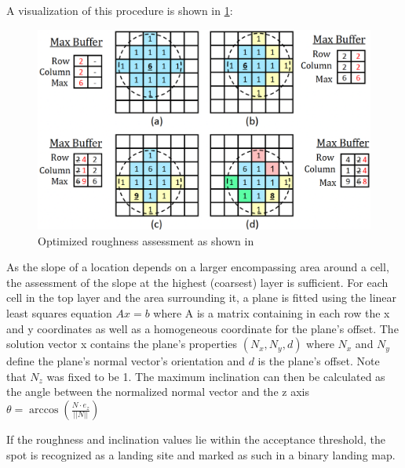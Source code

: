 A visualization of this procedure is shown in \cref{fig:lsd_roughness_check}:

\begin{figure}[ht!]
    \centering
    \includegraphics[scale=0.5]{images/system_overview/roughness_check.png}
    \caption{Optimized roughness assessment as shown in \citet{LSD2}}
    \label{fig:lsd_roughness_check}
\end{figure}

As the slope of a location depends on a larger encompassing area around a cell, the assessment of the slope at the highest (coarsest) layer is sufficient. For each cell in the top layer and the area surrounding it, a plane is fitted using the linear least squares equation $Ax = b$ where A is a matrix containing in each row the x and y coordinates as well as a homogeneous coordinate for the plane's offset. The solution vector x contains the plane's properties $\left(N_x, N_y, d\right)$ where $N_x$ and $N_y$ define the plane's normal vector's orientation and $d$ is the plane's offset. Note that $N_z$ was fixed to be 1. The maximum inclination can then be calculated as the angle between the normalized normal vector and the z axis $\theta = \arccos\left(\frac{N \cdot e_z}{||N||}\right)$

If the roughness and inclination values lie within the acceptance threshold, the spot is recognized as a landing site and marked as such in a binary landing map. 


